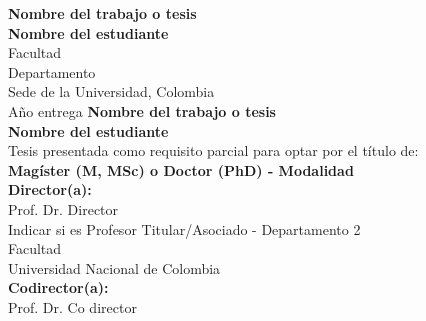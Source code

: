 \documentclass[10pt,spanish,fleqn,openany,twoside,letterpaper]{book}
\newcommand{\studentname}{}
\newcommand{\academictitle}{}
\newcommand{\thesisname}{}
\newcommand{\director}{}
\newcommand{\directortitle}{}
\newcommand{\codirector}{} %
\newcommand{\issuedate}{}
\newcommand{\sede}{}
\newcommand{\department}{}
\newcommand{\departmenttwo}{} %
\newcommand{\faculty}{}
\newcommand{\university}{Universidad Nacional de Colombia}
\renewcommand{\studentname}{Nombre del estudiante}
\renewcommand{\thesisname}{Nombre del trabajo o tesis}
\renewcommand{\issuedate}{Año entrega}
\renewcommand{\director}{Prof. Dr. Director}
\renewcommand{\directortitle}{Indicar si es Profesor Titular/Asociado}
\renewcommand{\codirector}{Prof. Dr. Co director}
\renewcommand{\academictitle}{Magíster (M, MSc) o Doctor (PhD) - Modalidad }
\renewcommand{\sede}{Sede de la Universidad}
\renewcommand{\department}{Departamento}
\renewcommand{\departmenttwo}{Departamento 2} %
\renewcommand{\faculty}{Facultad}
\begin{document}
\renewcommand{\listfigurename}{\sffamily Lista de figuras}
\renewcommand{\listtablename}{\sffamily Lista de tablas}
\renewcommand{\contentsname}{\sffamily Contenido}
\renewcommand{\chaptername}{\sffamily Capítulo}
\renewcommand{\tablename}{\scriptsize \centering \textbf{Tabla}}
\renewcommand{\figurename}{\scriptsize \centering \textbf{Figura}}
\renewcommand{\appendixname}{\sffamily Anexo}

\renewcommand{\bibname}{\sffamily Referencias Bibliográficas}

{\newpage
\thispagestyle{empty}
\begin{center}
\begin{figure}
\centering
{}%
\end{figure}
\vspace{2.5cm}
\textbf{\Huge \thesisname} \\ 
\vspace{2.5cm}
\textbf{\Large \studentname} \\
\vspace{5.0cm}
\faculty \\ \department \\
\sede, Colombia\\
\issuedate
\newpage 
\thispagestyle{empty}
\vspace{2.0cm}
\textbf{\Huge \thesisname} \\
\vspace{2.0cm}
\textbf{\Large \studentname} \\
\vspace{2.0cm}
\small Tesis presentada como requisito parcial para optar por el título de: \\
{\bfseries \academictitle}\\
\vspace{2.0cm}
\textbf{Director(a):} \\
\director \\
\directortitle \; - \departmenttwo \\
\faculty \\
\university \\ 
\vspace{0.5cm}
\textbf{Codirector(a):} \\
\codirector \\

\end{center}}
\end{document}

